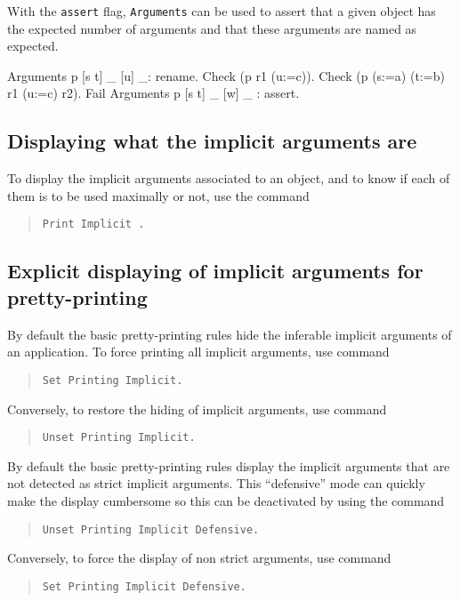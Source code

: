 With the {\tt assert} flag, {\tt Arguments} can be used to assert
that a given object has the expected number of arguments and that
these arguments are named as expected.

\begin{coq_example}
Arguments p [s t] _ [u] _: rename.
Check (p r1 (u:=c)).
Check (p (s:=a) (t:=b) r1 (u:=c) r2).
Fail Arguments p [s t] _ [w] _ : assert.
\end{coq_example}


\subsection{Displaying what the implicit arguments are
\label{PrintImplicit}}

To display the implicit arguments associated to an object, and to know
if each of them is to be used maximally or not, use the command
\begin{quote}
\tt Print Implicit {\qualid}.
\end{quote}

\subsection{Explicit displaying of implicit arguments for pretty-printing
}

By default the basic pretty-printing rules hide the inferable implicit
arguments of an application. To force printing all implicit arguments,
use command
\begin{quote}
{\tt Set Printing Implicit.}
\end{quote}
Conversely, to restore the hiding of implicit arguments, use command
\begin{quote}
{\tt Unset Printing Implicit.}
\end{quote}

By default the basic pretty-printing rules display the implicit arguments that are not detected as strict implicit arguments. This ``defensive'' mode can quickly make the display cumbersome so this can be deactivated by using the command
\begin{quote}
{\tt Unset Printing Implicit Defensive.}
\end{quote}
Conversely, to force the display of non strict arguments, use command
\begin{quote}
{\tt Set Printing Implicit Defensive.}
\end{quote}

